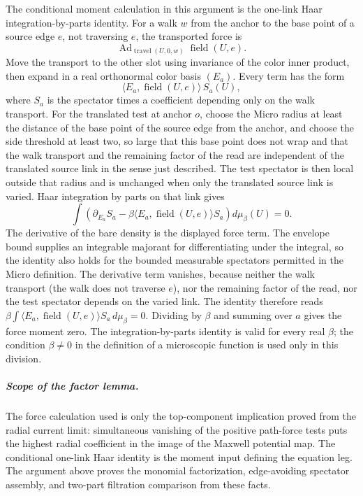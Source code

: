 The conditional moment calculation in this argument is the one-link
Haar integration-by-parts identity. For a walk $w$ from the anchor to the
base point of a source edge $e$, not traversing $e$, the transported force
is
\[
       \operatorname{Ad}_{\operatorname{travel}(U,0,w)}
                                  \operatorname{field}(U,e).
\]
Move the transport to the other slot using invariance of the color inner
product, then expand in a real orthonormal color basis $(E_a)$. Every
term has the form
\[
 \langle E_a,\operatorname{field}(U,e)\rangle\,S_a(U),
\]
where $S_a$ is the spectator times a coefficient depending only on the
walk transport. For the translated test at anchor $o$, choose the Micro
radius at least the distance of the base point of the source edge from
the anchor, and choose the side threshold at least two, so large that this
base point does not wrap and that the walk transport and the remaining
factor of the read are independent of the translated source link in the
sense just described. The test
spectator is then local outside that radius and is unchanged when only
the translated source link is varied. Haar integration by parts on that
link gives
\[
 \int \left(\partial_{E_a}S_a
       -\beta\langle E_a,\operatorname{field}(U,e)\rangle S_a\right)
            d\mu_\beta(U)=0.
\]
The derivative of the bare density is the
displayed force term. The envelope bound supplies an integrable majorant
for differentiating under the integral, so the identity also holds for
the bounded measurable spectators permitted in the Micro definition.
The derivative term vanishes, because neither the walk transport (the
walk does not traverse $e$), nor the remaining factor of the read, nor the
test spectator depends on the varied link. The identity therefore reads
$\beta\int\langle E_a,\operatorname{field}(U,e)\rangle S_a\,d\mu_\beta=0$.
Dividing by $\beta$ and
summing over $a$ gives the force moment zero. The integration-by-parts
identity is valid for every real $\beta$; the condition $\beta\ne0$ in
the definition of a microscopic function is used only in this division.

\subparagraph{Scope of the factor lemma.}
The force calculation used is only the top-component implication proved
from the radial current limit: simultaneous vanishing of the positive
path-force tests puts the highest radial coefficient in the image of the
Maxwell potential map. The conditional one-link Haar identity is the
moment input defining the equation leg. The argument above proves the
monomial factorization, edge-avoiding spectator assembly, and two-part
filtration comparison from these facts.

